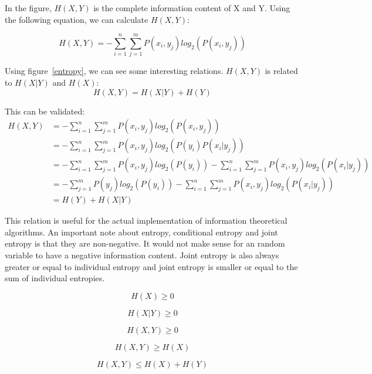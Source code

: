In the figure, $H(X,Y)$ is the complete information content of X and Y. Using the following equation, we can calculate $H(X,Y)$:

\begin{equation}
H(X,Y) = -\sum_{i=1}^{n}\sum_{j=1}^{m}P(x_i, y_j)log_2(P(x_i, y_j))
\end{equation}

Using figure~\ref{entropy}, we can see some interesting relations. $H(X,Y)$ is related to $H(X|Y)$ and $H(X)$:
\begin{equation}\label{joint}
H(X,Y) = H(X|Y) + H(Y)
\end{equation}

This can be validated:
\begin{align*}
H(X,Y) &= -\sum_{i=1}^{n}\sum_{j=1}^{m}P(x_i, y_j)log_2(P(x_i, y_j))\\
&= -\sum_{i=1}^{n}\sum_{j=1}^{m}P(x_i, y_j)log_2(P(y_i)P(x_i | y_j))\\
&= -\sum_{i=1}^{n}\sum_{j=1}^{m}P(x_i, y_j)log_2(P(y_i))-\sum_{i=1}^{n}\sum_{j=1}^{m}P(x_i, y_j)log_2(P(x_i | y_j))\\
&= -\sum_{j=1}^{m}P(y_j)log_2(P(y_i))-\sum_{i=1}^{n}\sum_{j=1}^{m}P(x_i, y_j)log_2(P(x_i | y_j))\\
&= H(Y) + H(X|Y)
\end{align*}

This relation is useful for the actual implementation of information theoretical algorithms. An important note about entropy, conditional entropy and joint entropy is that they are non-negative. It would not make sense for an random variable to have a negative information content. Joint entropy is also always greater or equal to individual entropy and joint entropy is smaller or equal to the sum of individual entropies.

\begin{equation}
H(X) \ge 0
\end{equation}

\begin{equation}
H(X|Y) \ge 0
\end{equation}

\begin{equation}
H(X,Y) \ge 0
\end{equation}

\begin{equation}
H(X,Y) \ge H(X)
\end{equation}

\begin{equation}
H(X,Y) \le H(X) + H(Y) 
\end{equation}


